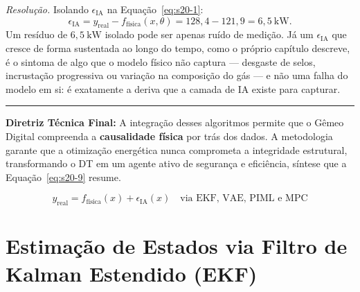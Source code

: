 \documentclass[12pt,a4paper]{article}
\numberwithin{equation}{section}
\numberwithin{table}{section}
\numberwithin{figure}{section}
\begin{document}
	\emph{Resolução.} Isolando $\epsilon_{\text{IA}}$ na
	Equação~\eqref{eq:s20-1}:
	$$\epsilon_{\text{IA}} = y_{\text{real}} - f_{\text{física}}(x,\theta)
	= 128{,}4 - 121{,}9 = 6{,}5\ \mathrm{kW}.$$
	Um resíduo de $6{,}5\ \mathrm{kW}$ isolado pode ser apenas ruído de
	medição. Já um $\epsilon_{\text{IA}}$ que cresce de forma sustentada ao
	longo do tempo, como o próprio capítulo descreve, é o sintoma de algo
	que o modelo físico não captura --- desgaste de selos, incrustação
	progressiva ou variação na composição do gás --- e não uma falha do
	modelo em si: é exatamente a deriva que a camada de IA existe para
	capturar.

	\vspace{1em}
	\hrule
	\vspace{1em}

	\textbf{Diretriz Técnica Final:} A integração desses algoritmos permite que o Gêmeo Digital compreenda a \textbf{causalidade física} por trás dos dados. A metodologia garante que a otimização energética nunca comprometa a integridade estrutural, transformando o DT em um agente ativo de segurança e eficiência, síntese que a Equação~\eqref{eq:s20-9} resume.

	\begin{equation}\label{eq:s20-9}
 \boxed{y_{\text{real}} = f_{\text{física}}(x) + \epsilon_{\text{IA}}(x) \quad \text{via EKF, VAE, PIML e MPC}} 
\end{equation}


	
	\clearpage
	\section{Estimação de Estados via Filtro de Kalman Estendido (EKF)}

\end{document}
